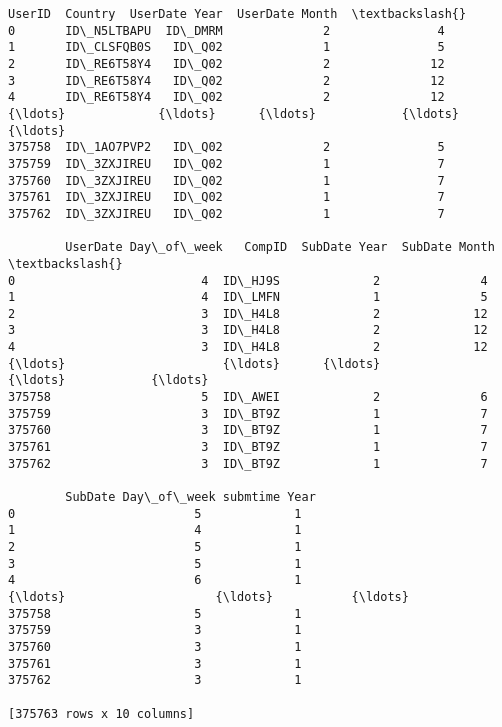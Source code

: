 \documentclass{report}
\makeatletter
\newcommand{\boxspacing}{\kern\kvtcb@left@rule\kern\kvtcb@boxsep}
\newcommand{\prompt}[4]{
        \ttfamily\llap{{\color{#2}[#3]:\hspace{3pt}#4}}\vspace{-\baselineskip}
    }
\makeatother
\begin{document}
            \begin{tcolorbox}[breakable, size=fbox, boxrule=.5pt, pad at break*=1mm, opacityfill=0]
\prompt{Out}{outcolor}{9}{\boxspacing}
\begin{Verbatim}[commandchars=\\\{\}]
             UserID  Country  UserDate Year  UserDate Month  \textbackslash{}
0       ID\_N5LTBAPU  ID\_DMRM              2               4
1       ID\_CLSFQB0S   ID\_Q02              1               5
2       ID\_RE6T58Y4   ID\_Q02              2              12
3       ID\_RE6T58Y4   ID\_Q02              2              12
4       ID\_RE6T58Y4   ID\_Q02              2              12
{\ldots}             {\ldots}      {\ldots}            {\ldots}             {\ldots}
375758  ID\_1AO7PVP2   ID\_Q02              2               5
375759  ID\_3ZXJIREU   ID\_Q02              1               7
375760  ID\_3ZXJIREU   ID\_Q02              1               7
375761  ID\_3ZXJIREU   ID\_Q02              1               7
375762  ID\_3ZXJIREU   ID\_Q02              1               7

        UserDate Day\_of\_week   CompID  SubDate Year  SubDate Month  \textbackslash{}
0                          4  ID\_HJ9S             2              4
1                          4  ID\_LMFN             1              5
2                          3  ID\_H4L8             2             12
3                          3  ID\_H4L8             2             12
4                          3  ID\_H4L8             2             12
{\ldots}                      {\ldots}      {\ldots}           {\ldots}            {\ldots}
375758                     5  ID\_AWEI             2              6
375759                     3  ID\_BT9Z             1              7
375760                     3  ID\_BT9Z             1              7
375761                     3  ID\_BT9Z             1              7
375762                     3  ID\_BT9Z             1              7

        SubDate Day\_of\_week submtime Year
0                         5             1
1                         4             1
2                         5             1
3                         5             1
4                         6             1
{\ldots}                     {\ldots}           {\ldots}
375758                    5             1
375759                    3             1
375760                    3             1
375761                    3             1
375762                    3             1

[375763 rows x 10 columns]
\end{Verbatim}
\end{tcolorbox}
        
\end{document}
